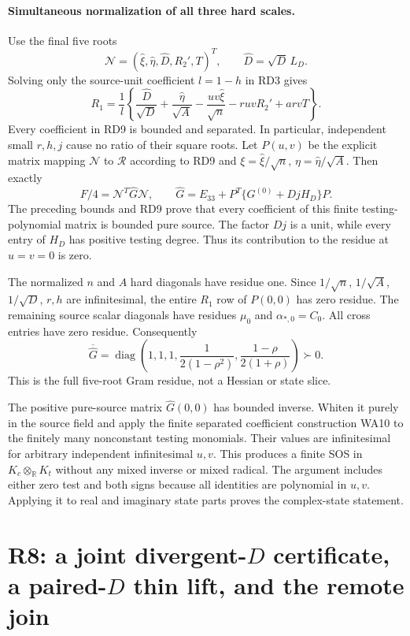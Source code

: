 \paragraph{Simultaneous normalization of all three hard scales.}
Use the final five roots
\[
 \mathcal N=(\widehat\xi,\widehat\eta,\widehat D,R_2',T)^T,
 \qquad\widehat D=\sqrt D\,L_D.                    \tag{RD8}
\]
Solving only the source-unit coefficient $l=1-h$ in RD3 gives
\[
 R_1=\frac1l\left\{
 \frac{\widehat D}{\sqrt D}
 +\frac{\widehat\eta}{\sqrt A}
 -\frac{uv\widehat\xi}{\sqrt n}
 -ruvR_2'+arvT\right\}.                            \tag{RD9}
\]
Every coefficient in RD9 is bounded and separated. In particular,
independent small $r,h,j$ cause no ratio of their square roots.
Let $P(u,v)$ be the explicit matrix mapping $\mathcal N$ to
$\mathcal R$ according to RD9 and
$\xi=\widehat\xi/\sqrt n$, $\eta=\widehat\eta/\sqrt A$.
Then exactly
\[
 F/4=\mathcal N^T\widehat G\mathcal N,
 \qquad
 \widehat G=E_{33}+P^T\{G^{(0)}+DjH_D\}P.          \tag{RD10}
\]
The preceding bounds and RD9 prove that every coefficient of this
finite testing-polynomial matrix is bounded pure source. The factor
$Dj$ is a unit, while every entry of $H_D$ has positive testing degree.
Thus its contribution to the residue at $u=v=0$ is zero.

The normalized $n$ and $A$ hard diagonals have residue one. Since
$1/\sqrt n$, $1/\sqrt A$, $1/\sqrt D$, $r,h$ are infinitesimal,
the entire $R_1$ row of $P(0,0)$ has zero residue. The remaining
source scalar diagonals have residues $\mu_0$ and $\alpha_{*,0}=C_0$.
All cross entries have zero residue. Consequently
\[
 \overline{\widehat G}
   =\operatorname{diag}\left(1,1,1,
              \frac1{2(1-\rho^2)},
              \frac{1-\rho}{2(1+\rho)}\right)\succ0. \tag{RD11}
\]
This is the full five-root Gram residue, not a Hessian or state slice.

The positive pure-source matrix $\widehat G(0,0)$ has bounded inverse.
Whiten it purely in the source field and apply the finite separated
coefficient construction WA10 to the finitely many nonconstant
testing monomials. Their values are infinitesimal for arbitrary
independent infinitesimal $u,v$. This produces a finite SOS in
$K_c\otimes_{\mathbb R}K_t$ without any mixed inverse or mixed radical.
The argument includes either zero test and both signs because all
identities are polynomial in $u,v$. Applying it to real and imaginary
state parts proves the complex-state statement.



\section{\texorpdfstring{R8: a joint divergent-$D$ certificate, a paired-$D$ thin lift, and the remote join}{R8: a joint divergent-D certificate, a paired-D thin lift, and the remote join}}
\label{component:pe07041e033da}


